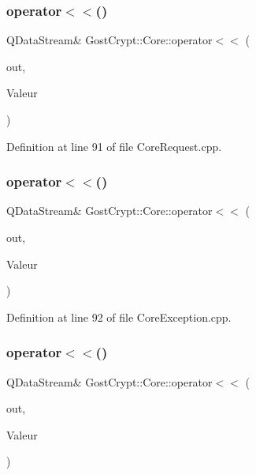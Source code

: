 \subsubsection{\texorpdfstring{operator$<$$<$()}{operator<<()}\hspace{0.1cm}{\footnotesize\ttfamily [14/56]}}
{\footnotesize\ttfamily Q\+Data\+Stream\& Gost\+Crypt\+::\+Core\+::operator$<$$<$ (\begin{DoxyParamCaption}\item[{Q\+Data\+Stream \&}]{out,  }\item[{const \hyperlink{struct_gost_crypt_1_1_core_1_1_change_volume_password_request}{Change\+Volume\+Password\+Request} \&}]{Valeur }\end{DoxyParamCaption})}



Definition at line 91 of file Core\+Request.\+cpp.

\mbox{\label{namespace_gost_crypt_1_1_core_a931125886c7d661d257b2fbcd7ba8b16}} 
\subsubsection{\texorpdfstring{operator$<$$<$()}{operator<<()}\hspace{0.1cm}{\footnotesize\ttfamily [15/56]}}
{\footnotesize\ttfamily Q\+Data\+Stream\& Gost\+Crypt\+::\+Core\+::operator$<$$<$ (\begin{DoxyParamCaption}\item[{Q\+Data\+Stream \&}]{out,  }\item[{const \hyperlink{class_gost_crypt_1_1_core_1_1_failed_open_volume}{Gost\+Crypt\+::\+Core\+::\+Failed\+Open\+Volume} \&}]{Valeur }\end{DoxyParamCaption})}



Definition at line 92 of file Core\+Exception.\+cpp.

\mbox{\label{namespace_gost_crypt_1_1_core_aa1eafda975ed8369f7dbd969b4a57232}} 
\subsubsection{\texorpdfstring{operator$<$$<$()}{operator<<()}\hspace{0.1cm}{\footnotesize\ttfamily [16/56]}}
{\footnotesize\ttfamily Q\+Data\+Stream\& Gost\+Crypt\+::\+Core\+::operator$<$$<$ (\begin{DoxyParamCaption}\item[{Q\+Data\+Stream \&}]{out,  }\item[{const \hyperlink{struct_gost_crypt_1_1_core_1_1_mount_volume_response}{Mount\+Volume\+Response} \&}]{Valeur }\end{DoxyParamCaption})}



